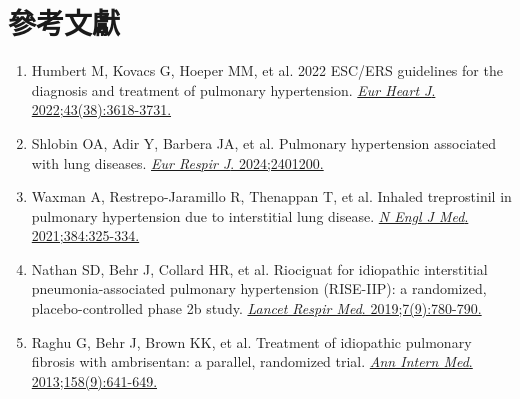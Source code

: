 \documentclass[11pt,a4paper]{article}
\begin{document}
\section{參考文獻}

\begin{enumerate}
    \item Humbert M, Kovacs G, Hoeper MM, et al. 2022 ESC/ERS guidelines for the diagnosis and treatment of pulmonary hypertension. \href{https://doi.org/10.1093/eurheartj/ehac237}{\textit{Eur Heart J}. 2022;43(38):3618-3731.}

    \item Shlobin OA, Adir Y, Barbera JA, et al. Pulmonary hypertension associated with lung diseases. \href{https://doi.org/10.1183/13993003.01200-2024}{\textit{Eur Respir J}. 2024;2401200.}

    \item Waxman A, Restrepo-Jaramillo R, Thenappan T, et al. Inhaled treprostinil in pulmonary hypertension due to interstitial lung disease. \href{https://doi.org/10.1056/NEJMoa2008470}{\textit{N Engl J Med}. 2021;384:325-334.}

    \item Nathan SD, Behr J, Collard HR, et al. Riociguat for idiopathic interstitial pneumonia-associated pulmonary hypertension (RISE-IIP): a randomized, placebo-controlled phase 2b study. \href{https://doi.org/10.1016/S2213-2600(19)30250-4}{\textit{Lancet Respir Med}. 2019;7(9):780-790.}

    \item Raghu G, Behr J, Brown KK, et al. Treatment of idiopathic pulmonary fibrosis with ambrisentan: a parallel, randomized trial. \href{https://doi.org/10.7326/0003-4819-158-9-201305070-00003}{\textit{Ann Intern Med}. 2013;158(9):641-649.}
\end{enumerate}
\end{document}
